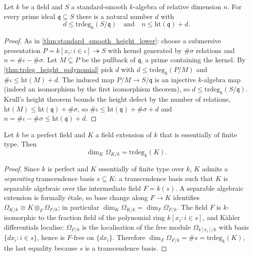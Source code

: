 \begin{theorem}
  \label{thm:trdeg_height_standard_smooth}
  \leanok
  Let \(k\) be a field and \(S\) a standard-smooth \(k\)-algebra of relative dimension
  \(n\). For every prime ideal \(\mathfrak q \subseteq S\) there is a natural number
  \(d\) with
  \[
    d \leq \mathrm{trdeg}_k(S/\mathfrak q)
    \quad\text{and}\quad
    n \leq \mathrm{ht}(\mathfrak q) + d.
  \]
\end{theorem}
\begin{proof}
  \leanok
  As in \ref{thm:standard_smooth_height_lower}: choose a submersive presentation
  \(P = k[x_i : i \in \iota] \twoheadrightarrow S\) with kernel generated by
  \(\#\sigma\) relations and \(n = \#\iota - \#\sigma\). Let \(M \subseteq P\) be the
  pullback of \(\mathfrak q\), a prime containing the kernel. By
  \ref{thm:trdeg_height_polynomial} pick \(d\) with \(d \leq \mathrm{trdeg}_k(P/M)\) and
  \(\#\iota \leq \mathrm{ht}(M) + d\). The induced map \(P/M \to S/\mathfrak q\) is an
  injective \(k\)-algebra map (indeed an isomorphism by the first isomorphism theorem),
  so \(d \leq \mathrm{trdeg}_k(S/\mathfrak q)\). Krull's height theorem bounds the
  height defect by the number of relations,
  \(\mathrm{ht}(M) \leq \mathrm{ht}(\mathfrak q) + \#\sigma\), so
  \(\#\iota \leq \mathrm{ht}(\mathfrak q) + \#\sigma + d\) and
  \(n = \#\iota - \#\sigma \leq \mathrm{ht}(\mathfrak q) + d\).
\end{proof}

\begin{theorem}
  \label{thm:kaehler_rank_trdeg}
  \leanok
  Let \(k\) be a perfect field and \(K\) a field extension of \(k\) that is essentially
  of finite type. Then
  \[
    \dim_K \Omega_{K/k} = \mathrm{trdeg}_k(K).
  \]
\end{theorem}
\begin{proof}
  \leanok
  Since \(k\) is perfect and \(K\) essentially of finite type over \(k\), \(K\) admits a
  \emph{separating} transcendence basis \(s \subseteq K\): a transcendence basis such
  that \(K\) is separable algebraic over the intermediate field \(F = k(s)\). A
  separable algebraic extension is formally \'etale, so base change along \(F \to K\)
  identifies \(\Omega_{K/k} \cong K \otimes_F \Omega_{F/k}\); in particular
  \(\dim_K \Omega_{K/k} = \dim_F \Omega_{F/k}\). The field \(F\) is \(k\)-isomorphic to
  the fraction field of the polynomial ring \(k[x_i : i \in s]\), and K\"ahler
  differentials localise: \(\Omega_{F/k}\) is the localisation of the free module
  \(\Omega_{k[x_i]/k}\) with basis \(\{dx_i : i \in s\}\), hence is \(F\)-free on
  \(\{dx_i\}\). Therefore
  \(\dim_F \Omega_{F/k} = \#s = \mathrm{trdeg}_k(K)\), the last equality because \(s\)
  is a transcendence basis.
\end{proof}


